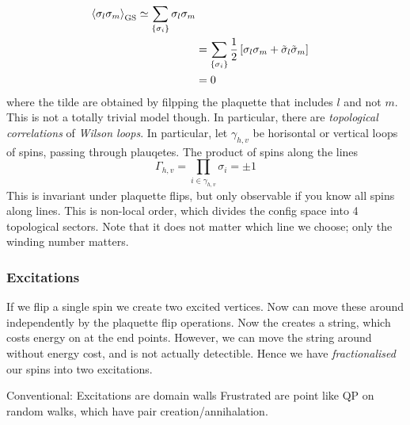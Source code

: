 \documentclass[a4paper]{article}
\begin{document}
\begin{align*}
    \braket{\sigma_l\sigma_m}_{\mathrm{GS}}\simeq \sum_{\{\sigma_i\}}
    \sigma_l\sigma_m\\
    &=\sum_{\{\sigma_i\}}
    \frac{1}{2}\left[\sigma_l\sigma_m+\tilde{\sigma}_l\tilde{\sigma}_m \right]\\
    &=0
\end{align*}
where the tilde are obtained by filpping the plaquette that includes $l$ and not
$m$.
This is not a totally trivial model though. In particular, there are
\emph{topological correlations} of \emph{Wilson loops}. In particular, let
$\gamma_{h,v}$ be horisontal or vertical loops of spins, passing through
plauqetes. The product of spins
along the lines 
\[ \Gamma_{h,v}=\prod_{i\in\gamma_{h,v}} \sigma_{i}=\pm 1\]
This is invariant under plaquette flips, but only observable if you know all
spins along lines. This is non-local order, which divides  the config space into
4 topological sectors. Note that it does not matter which line we choose; only
the winding number matters.
\subsubsection{Excitations}
If we flip a single spin we create two excited vertices. Now can move these
around independently by the plaquette flip operations. Now the creates a string,
which  costs energy on at the end points. However, we can move the string around
without energy cost, and is not actually detectible. Hence we have
\emph{fractionalised} our spins into two excitations.

\begin{example}
    Conventional: Excitations are domain walls
    Frustrated are point like QP on random walks, which have pair
    creation/annihalation.
\end{example}
\end{document}
